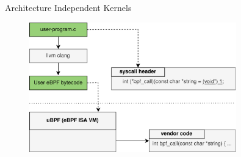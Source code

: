 \documentclass{beamer}
\begin{document}
% 
\begin{frame}{Architecture Independent Kernels}
	\begingroup
	\begin{figure}
		\centering
		\includegraphics[width=0.8\textwidth]{resources/images/ubpf-medium.png}
	\end{figure}
	\endgroup
\end{frame}

% 
\end{document}
